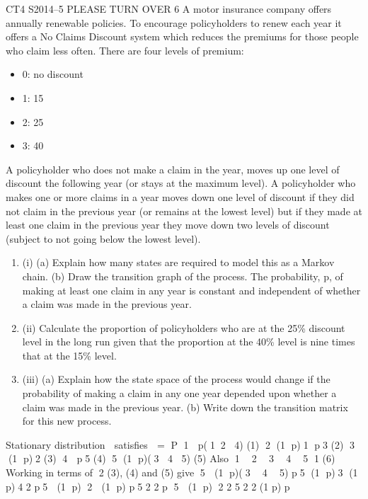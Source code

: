\documentclass[a4paper,12pt]{article}
\begin{document}
CT4 S2014–5 PLEASE TURN OVER
6 A motor insurance company offers annually renewable policies. To encourage
policyholders to renew each year it offers a No Claims Discount system which
reduces the premiums for those people who claim less often. There are four levels of
premium:
\begin{itemize}
\item   0: no discount
\item 1: 15%
\item 2: 25%
\item 3: 40%
\end{itemize}

A policyholder who does not make a claim in the year, moves up one level of
discount the following year (or stays at the maximum level).
A policyholder who makes one or more claims in a year moves down one level of
discount if they did not claim in the previous year (or remains at the lowest level) but
if they made at least one claim in the previous year they move down two levels of
discount (subject to not going below the lowest level).
\begin{enumerate}
\item (i) (a) Explain how many states are required to model this as a Markov chain.
(b) Draw the transition graph of the process. 
The probability, p, of making at least one claim in any year is constant and
independent of whether a claim was made in the previous year.
\item (ii) Calculate the proportion of policyholders who are at the 25\% discount level in
the long run given that the proportion at the 40\% level is nine times that at the
15\% level. 
\item (iii) (a) Explain how the state space of the process would change if the
probability of making a claim in any one year depended upon whether
a claim was made in the previous year.
(b) Write down the transition matrix for this new process. 
\end{enumerate}
\newpage


Stationary distribution  satisfies  = P
1  p(12 4) (1)
2 (1 p)1 p3 (2)
3 (1 p)2 (3)
4  p5 (4)
5 (1 p)(3 4 5) (5)
Also 1  2  3  4  5 1 (6)
Working in terms of 2
(3), (4) and (5) give 5  (1 p)(3  4  5)
p5 (1 p)3 (1 p)4
2
p5  (1 p) 2  (1 p) p5
2 2
p 5  (1 p) 2
2
5 2 2
(1 p)
p

  
\end{document}
